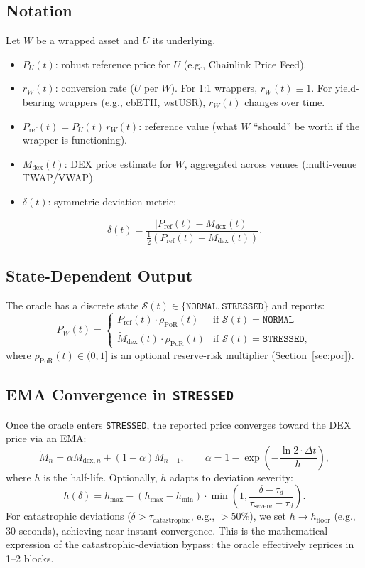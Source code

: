\documentclass[11pt]{article}
\newcommand{\NORMAL}{\texttt{NORMAL}}
\newcommand{\STRESSED}{\texttt{STRESSED}}
\begin{document}
\subsection{Notation}

Let $W$ be a wrapped asset and $U$ its underlying.
\begin{itemize}[leftmargin=*]
  \item $P_U(t)$: robust reference price for $U$ (e.g., Chainlink Price Feed).
  \item $r_W(t)$: conversion rate ($U$ per $W$). For 1:1 wrappers, $r_W(t)\equiv 1$. For yield-bearing wrappers (e.g., cbETH, wstUSR), $r_W(t)$ changes over time.
  \item $P_{\mathrm{ref}}(t)=P_U(t)\,r_W(t)$: reference value (what $W$ ``should'' be worth if the wrapper is functioning).
  \item $M_{\mathrm{dex}}(t)$: DEX price estimate for $W$, aggregated across venues (multi-venue TWAP/VWAP).
  \item $\delta(t)$: symmetric deviation metric:
\end{itemize}
\[
\delta(t)=\frac{|P_{\mathrm{ref}}(t)-M_{\mathrm{dex}}(t)|}{\tfrac{1}{2}\left(P_{\mathrm{ref}}(t)+M_{\mathrm{dex}}(t)\right)}.
\]

\subsection{State-Dependent Output}

The oracle has a discrete state $\mathcal{S}(t)\in\{\NORMAL,\STRESSED\}$ and reports:
\[
P_W(t)=
\begin{cases}
P_{\mathrm{ref}}(t)\cdot \rho_{\mathrm{PoR}}(t) & \text{if }\mathcal{S}(t)=\NORMAL\\
\tilde{M}_{\mathrm{dex}}(t)\cdot \rho_{\mathrm{PoR}}(t) & \text{if }\mathcal{S}(t)=\STRESSED,
\end{cases}
\]
where $\rho_{\mathrm{PoR}}(t)\in(0,1]$ is an optional reserve-risk multiplier (Section~\ref{sec:por}).

\subsection{EMA Convergence in \STRESSED}

Once the oracle enters \STRESSED, the reported price converges toward the DEX price via an EMA:
\[
\tilde{M}_{n}= \alpha M_{\mathrm{dex},n}+(1-\alpha)\tilde{M}_{n-1},
\qquad
\alpha=1-\exp\!\left(-\frac{\ln 2\cdot \Delta t}{h}\right),
\]
where $h$ is the half-life. Optionally, $h$ adapts to deviation severity:
\[
h(\delta)=h_{\max}-(h_{\max}-h_{\min})\cdot 
\min\!\left(1,\frac{\delta-\tau_d}{\tau_{\mathrm{severe}}-\tau_d}\right).
\]
For catastrophic deviations ($\delta > \tau_{\mathrm{catastrophic}}$, e.g., $>50\%$), we set $h\to h_{\mathrm{floor}}$ (e.g., 30 seconds), achieving near-instant convergence. This is the mathematical expression of the catastrophic-deviation bypass: the oracle effectively reprices in 1--2 blocks.
\end{document}

